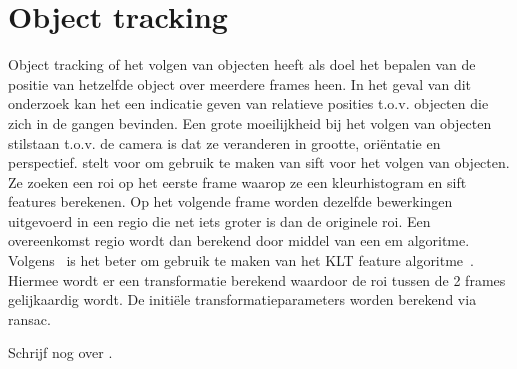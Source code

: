     \section{Object tracking}
        Object tracking of het volgen van objecten heeft als doel het bepalen van de positie van hetzelfde object over meerdere frames heen. In het geval van dit onderzoek kan het een indicatie geven van relatieve posities t.o.v. objecten die zich in de gangen bevinden.
        Een grote moeilijkheid bij het volgen van objecten stilstaan t.o.v. de camera is dat ze veranderen in grootte, ori\"{e}ntatie en perspectief.
        \cite{Zhou2009} stelt voor om gebruik te maken van \gls{sift} voor het volgen van objecten. Ze zoeken een \gls{roi} op het eerste frame waarop ze een kleurhistogram en \gls{sift} features berekenen.
        Op het volgende frame worden dezelfde bewerkingen uitgevoerd in een regio die net iets groter is dan de originele \gls{roi}. Een overeenkomst regio wordt dan berekend door middel van een \gls{em} algoritme.
        Volgens~\cite{Baheti2016} is het beter om gebruik te maken van het KLT feature algoritme~\cite{tomasi1991detection}. Hiermee wordt er een transformatie berekend waardoor de \gls{roi} tussen de 2 frames gelijkaardig wordt. De initi\"{e}le transformatieparameters worden berekend via \gls{ransac}.

        Schrijf nog over \cite{Ning2017}.

